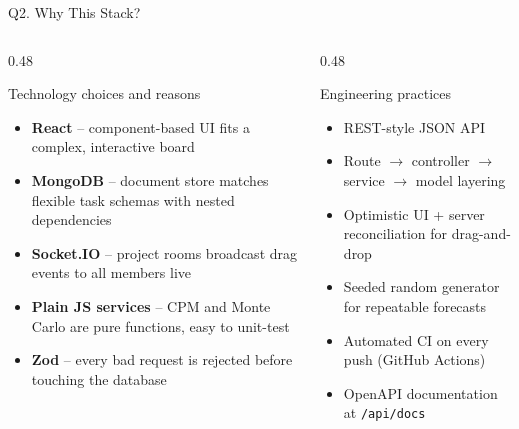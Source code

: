 \documentclass[11pt,aspectratio=169]{beamer}
\begin{document}
\begin{frame}{Q2. Why This Stack?}
  \begin{columns}[T]
    \begin{column}{0.48\textwidth}
      \begin{block}{Technology choices and reasons}
        \begin{itemize}
          \item \textbf{React} -- component-based UI fits a complex, interactive board
          \item \textbf{MongoDB} -- document store matches flexible task schemas with nested dependencies
          \item \textbf{Socket.IO} -- project rooms broadcast drag events to all members live
          \item \textbf{Plain JS services} -- CPM and Monte Carlo are pure functions, easy to unit-test
          \item \textbf{Zod} -- every bad request is rejected before touching the database
        \end{itemize}
      \end{block}
    \end{column}
    \begin{column}{0.48\textwidth}
      \begin{block}{Engineering practices}
        \begin{itemize}
          \item REST-style JSON API
          \item Route $\rightarrow$ controller $\rightarrow$ service $\rightarrow$ model layering
          \item Optimistic UI + server reconciliation for drag-and-drop
          \item Seeded random generator for repeatable forecasts
          \item Automated CI on every push (GitHub Actions)
          \item OpenAPI documentation at \texttt{/api/docs}
        \end{itemize}
      \end{block}
    \end{column}
  \end{columns}
\end{frame}
\end{document}
